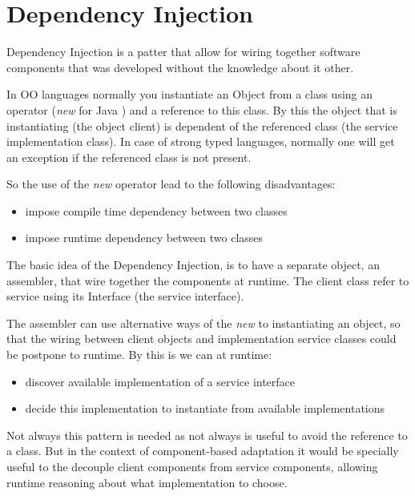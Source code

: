 \section{Dependency Injection}

Dependency Injection is a patter that allow for wiring together software components that was developed without the knowledge about it other. \cite{fowler_inversion_2004}

In OO languages normally you instantiate an Object from a class using an operator (\emph{new} for Java ) and a reference to this class. By this the object that is instantiating (the object client) is dependent of the referenced class (the service implementation class). In case of strong typed languages, normally one will get an exception if the referenced class is not present.

So the use of the \emph{new} operator lead to the following disadvantages:
\begin{itemize}
  \item impose compile time dependency between two classes
  \item impose runtime dependency between two classes
\end{itemize}

The basic idea of the Dependency Injection, is to have a separate object, an assembler, that wire together the components at runtime\cite{fowler_inversion_2004}. The client class refer to service using its Interface (the service interface).

The assembler can use alternative ways of the \emph{new} to instantiating an object, so that the wiring between client objects and implementation service classes could be postpone to runtime.
By this is we can at runtime:
\begin{itemize}
  \item discover available implementation of a service interface
  \item decide this implementation to instantiate from available implementations
\end{itemize}

Not always this pattern is needed as not always is useful to avoid the reference to a class. But in the context of component-based adaptation it would be specially useful to the decouple client components from service components, allowing runtime reasoning about what implementation to choose.

